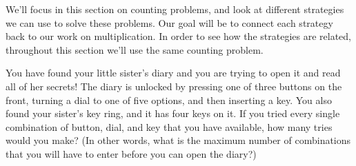 \documentclass{ximera}
\begin{document}
We'll focus in this section on counting problems, and look at different strategies we can use to solve these problems. Our goal will be to connect each strategy back to our work on multiplication. In order to see how the strategies are related, throughout this section we'll use the same counting problem.
\begin{example}
You have found your little sister's diary and you are trying to open it and read all of her secrets! The diary is unlocked by pressing one of three buttons on the front, turning a dial to one of five options, and then inserting a key. You also found your sister's key ring, and it has four keys on it. If you tried every single combination of button, dial, and key that you have available, how many tries would you make? (In other words, what is the maximum number of combinations that you will have to enter before you can open the diary?)
\end{example}
\end{document}
